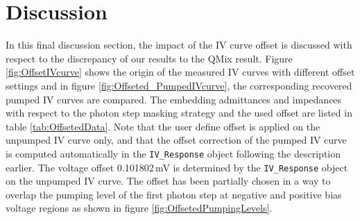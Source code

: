 \documentclass[]{article}
\begin{document}
\section{Discussion}
In this final discussion section, the impact of the IV curve offset is discussed with respect to the discrepancy of our results to the QMix result. Figure \ref{fig:OffsetIVcurve} shows the origin of the measured IV curves with different offset settings and in figure \ref{fig:Offseted_PumpedIVcurve}, the corresponding recovered pumped IV curves are compared. The embedding admittances and impedances with respect to the photon step masking strategy and the used offset are listed in table \ref{tab:OffsetedData}. Note that the user define offset is applied on the unpumped IV curve only, and that the offset correction of the pumped IV curve is computed automatically in the \texttt{IV\_Response} object following the description earlier. The voltage offset 0.101802\,mV is determined by the \texttt{IV\_Response} object on the unpumped IV curve. The offset has been partially chosen in a way to overlap the pumping level of the first photon step at negative and positive bias voltage regions as shown in figure \ref{fig:OffsetedPumpingLevels}.
\end{document}
